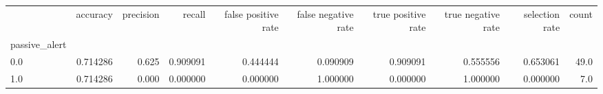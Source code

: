 \begin{tabular}{lrrrrrrrrr}
\toprule
{} &  accuracy &  precision &    recall &  false positive rate &  false negative rate &  true positive rate &  true negative rate &  selection rate &  count \\
passive\_alert &           &            &           &                      &                      &                     &                     &                 &        \\
\midrule
0.0           &  0.714286 &      0.625 &  0.909091 &             0.444444 &             0.090909 &            0.909091 &            0.555556 &        0.653061 &   49.0 \\
1.0           &  0.714286 &      0.000 &  0.000000 &             0.000000 &             1.000000 &            0.000000 &            1.000000 &        0.000000 &    7.0 \\
\bottomrule
\end{tabular}
